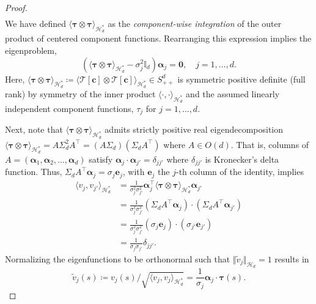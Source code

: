 \documentclass[pdflatex,iicol]{sn-jnl}%
\theoremstyle{thmstyleone}%
\theoremstyle{thmstyletwo}%
\theoremstyle{thmstylethree}%
\begin{document}
\begin{proof}
\begin{align}
    \end{align}
    We have defined $\langle \boldsymbol{\tau} \otimes \boldsymbol{\tau}\rangle_{\mathcal{H}^*_d}$ as the \textit{component-wise integration} of the outer product of centered component functions. Rearranging this expression implies the eigenproblem,
    \begin{equation} \label{equ:eigproblem}
        \left( \langle \boldsymbol{\tau} \otimes \boldsymbol{\tau}\rangle_{\mathcal{H}^*_d} - \sigma_j^2 \mathbb{I}_d \right)\boldsymbol{\alpha}_j =\boldsymbol{0}, \quad j=1,\dots,d.
    \end{equation}
    Here, $\langle \boldsymbol{\tau} \otimes \boldsymbol{\tau}\rangle_{\mathcal{H}^*_d} \coloneqq \langle \mathcal{T}[\boldsymbol{c}] \otimes \mathcal{T}[\boldsymbol{c}]\rangle_{\mathcal{H}^*_d}\in S^d_{++}$ is symmetric positive definite (full rank) by symmetry of the inner product $\langle\cdot, \cdot\rangle_{\mathcal{H}^*_d}$ and the assumed linearly independent component functions, $\tau_j$ for $j=1,\dots,d$. 
    
    Next, note that $\langle\boldsymbol{\tau}\otimes\boldsymbol{\tau}\rangle_{\mathcal{H}^*_d}$ admits strictly positive real eigendecomposition $\langle \boldsymbol{\tau} \otimes \boldsymbol{\tau} \rangle_{\mathcal{H}^*_d} = A\Sigma^2_d A^{\top} = (A\Sigma_d)(\Sigma_d A^{\top})$ where $A \in O(d)$. That is, columns of $A = (\boldsymbol{\alpha}_1, \boldsymbol{\alpha}_2,\dots, \boldsymbol{\alpha}_d)$ satisfy $\boldsymbol{\alpha}_j \cdot \boldsymbol{\alpha}_{j'} =\delta_{jj'}$ where $\delta_{jj'}$ is Kronecker's delta function. Thus, $\Sigma_d A^{\top}\boldsymbol{\alpha}_j = \sigma_j\boldsymbol{e}_j$, with $\boldsymbol{e}_j$ the $j$-th column of the identity, implies
    \begin{align}
        \langle v_j, v_{j'} \rangle_{\mathcal{H}^*_d} &= \frac{1}{\sigma_j^2 \sigma_{j'}^2}\boldsymbol{\alpha}_j^{\top}\langle \boldsymbol{\tau} \otimes \boldsymbol{\tau}\rangle_{\mathcal{H}^*_d}\boldsymbol{\alpha}_{j'} \\ \nonumber
        &= \frac{1}{\sigma_j^2 \sigma_{j'}^2}(\Sigma_d A^{\top}\boldsymbol{\alpha}_j)\cdot(\Sigma_d A^{\top}\boldsymbol{\alpha}_{j'}) \\ \nonumber
        &= \frac{1}{\sigma_j^2 \sigma_{j'}^2}(\sigma_j\boldsymbol{e}_j)\cdot (\sigma_{j'}\boldsymbol{e}_{j'})\\ \nonumber
        &= \frac{1}{\sigma_j\sigma_{j'}} \delta_{jj'}. \nonumber
    \end{align}
    Normalizing the eigenfunctions to be orthonormal such that $\Vert \widetilde{v}_j\Vert_{\mathcal{H}_d} = 1$ results in 
    \begin{equation}\label{eq:ortho_eigfunc}
        \widetilde{v}_j(s) \coloneqq v_j(s)\biggl / \sqrt{\langle v_j, v_j \rangle_{\mathcal{H}^*_d}} = \frac{1}{\sigma_j}\boldsymbol{\alpha}_j\cdot\boldsymbol{\tau}(s).
    \end{equation}
\end{proof}
\end{document}

